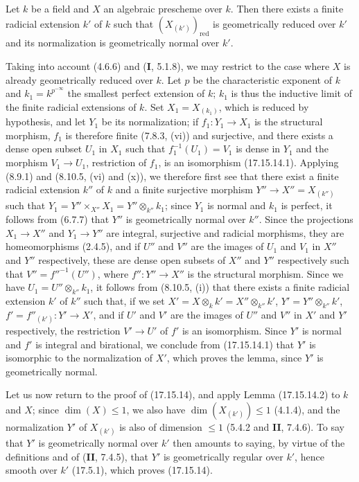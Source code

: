 \begin{lemma}[17.15.14.2]
\label{IV.17.15.14.2}
Let $k$ be a field and $X$ an algebraic prescheme over $k$. Then there exists a finite radicial extension $k'$ of $k$ such that $(X_{(k')})_{\mathrm{red}}$ is geometrically reduced over $k'$ and its normalization is geometrically normal over $k'$.
\end{lemma}

Taking into account (4.6.6) and (\textbf{I}, 5.1.8), we may restrict to the case where $X$ is already geometrically reduced over $k$. Let $p$ be the characteristic exponent of $k$ and $k_1=k^{p^{-\infty}}$ the smallest perfect extension of $k$; $k_1$ is thus the inductive limit of the finite radicial extensions of $k$. Set $X_1=X_{(k_1)}$, which is reduced by hypothesis, and let $Y_1$ be its normalization; if $f_1:Y_1\to X_1$ is the structural morphism, $f_1$ is therefore finite (7.8.3, (vi)) and surjective, and there exists a dense open subset $U_1$ in $X_1$ such that $f_1^{-1}(U_1)=V_1$ is dense in $Y_1$ and the morphism $V_1\to U_1$, restriction of $f_1$, is an isomorphism (17.15.14.1). Applying (8.9.1) and (8.10.5, (vi) and (x)), we therefore first see that there exist a finite radicial extension $k''$ of $k$ and a finite surjective morphism $Y''\to X''=X_{(k'')}$ such that $Y_1=Y''\times_{X''}X_1=Y''\otimes_{k''}k_1$; since $Y_1$ is normal and $k_1$ is perfect, it follows from (6.7.7) that $Y''$ is geometrically normal over $k''$. Since the projections $X_1\to X''$ and $Y_1\to Y''$ are integral, surjective and radicial morphisms, they are homeomorphisms (2.4.5), and if $U''$ and $V''$ are the images of $U_1$ and $V_1$ in $X''$ and $Y''$ respectively, these are dense open subsets of $X''$ and $Y''$ respectively such that $V''=f''^{-1}(U'')$, where $f'':Y''\to X''$ is the structural morphism. Since we have $U_1=U''\otimes_{k''}k_1$, it follows from (8.10.5, (i)) that there exists a finite radicial extension $k'$ of $k''$ such that, if we set $X'=X\otimes_k k'=X''\otimes_{k''}k'$, $Y'=Y''\otimes_{k''}k'$, $f'=f''_{(k')}:Y'\to X'$, and if $U'$ and $V'$ are the images of $U''$ and $V''$ in $X'$ and $Y'$ respectively, the restriction $V'\to U'$ of $f'$ is an isomorphism. Since $Y'$ is normal and $f'$ is integral and birational, we conclude from (17.15.14.1) that $Y'$ is isomorphic to the normalization of $X'$, which proves the lemma, since $Y'$ is geometrically normal.

Let us now return to the proof of (17.15.14), and apply Lemma (17.15.14.2) to $k$ and $X$; since $\dim(X)\leq1$, we also have $\dim(X_{(k')})\leq1$ (4.1.4), and the normalization $Y'$ of $X_{(k')}$ is also of dimension $\leq1$ (5.4.2 and \textbf{II}, 7.4.6). To say that $Y'$ is geometrically normal over $k'$ then amounts to saying, by virtue of the definitions and of (\textbf{II}, 7.4.5), that $Y'$ is geometrically regular over $k'$, hence smooth over $k'$ (17.5.1), which proves (17.15.14).

